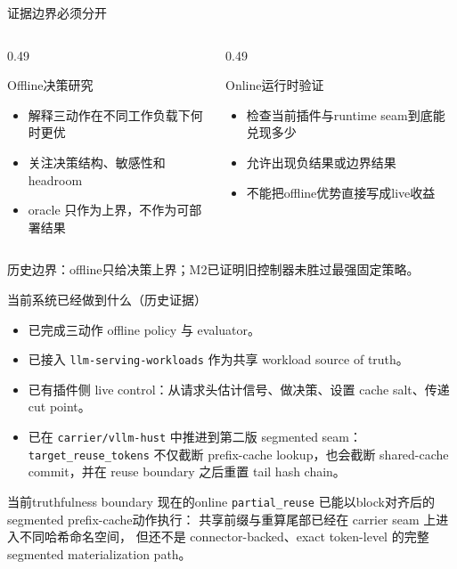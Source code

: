 \documentclass[aspectratio=169,UTF8,11pt]{ctexbeamer}
\begin{document}
\begin{frame}{证据边界必须分开}
  \begin{columns}[T]
    \begin{column}{0.49\textwidth}
      \begin{block}{Offline决策研究}
        \begin{itemize}
          \item 解释三动作在不同工作负载下何时更优
          \item 关注决策结构、敏感性和headroom
          \item oracle 只作为上界，不作为可部署结果
        \end{itemize}
      \end{block}
    \end{column}
    \begin{column}{0.49\textwidth}
      \begin{block}{Online运行时验证}
        \begin{itemize}
          \item 检查当前插件与runtime seam到底能兑现多少
          \item 允许出现负结果或边界结果
          \item 不能把offline优势直接写成live收益
        \end{itemize}
      \end{block}
    \end{column}
  \end{columns}

  \vspace{0.5em}
  \alert{历史边界：offline只给决策上界；M2已证明旧控制器未胜过最强固定策略。}
\end{frame}

\begin{frame}{当前系统已经做到什么（历史证据）}
  \begin{itemize}
    \item 已完成三动作 offline policy 与 evaluator。
    \item 已接入 \texttt{llm-serving-workloads} 作为共享 workload source of truth。
    \item 已有插件侧 live control：从请求头估计信号、做决策、设置 cache salt、传递 cut point。
    \item 已在 \texttt{carrier/vllm-hust} 中推进到第二版 segmented seam：\texttt{target\_reuse\_tokens} 不仅截断 prefix-cache lookup，也会截断 shared-cache commit，并在 reuse boundary 之后重置 tail hash chain。
  \end{itemize}

  \vspace{0.5em}
  \begin{block}{当前truthfulness boundary}
    现在的online \texttt{partial\_reuse} 已能以\alert{block对齐后的segmented prefix-cache动作}执行：
    共享前缀与重算尾部已经在 carrier seam 上进入不同哈希命名空间，
    但还不是 connector-backed、exact token-level 的完整 segmented materialization path。
  \end{block}
\end{frame}
\end{document}
